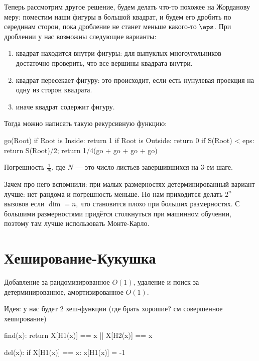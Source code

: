 Теперь рассмотрим другое решение, будем делать что-то похожее на Жорданову меру:
поместим наши фигуры в большой квадрат, и будем его дробить по серединам сторон,
пока дробление не станет меньше какого-то $\eps$. При дроблении у нас возможны следующие варианты:

\begin{enumerate}
    \item квадрат находится внутри фигуры: для выпуклых многоугольников
        достаточно проверить, что все вершины квадрата внутри.
    \item квадрат пересекает фигуру: это происходит, если есть нунулевая проекция
        на одну из сторон квадрата.
    \item иначе квадрат содержит фигуру.
\end{enumerate}

Тогда можно написать такую рекурсивную функцию:

\begin{cppcode}
    go(Root)
    if Root is Inside:
        return 1
    if Root is Outside:
        return 0
    if S(Root) < eps:
        return S(Root)/2;
    return 1/4(go + go + go + go)
\end{cppcode}

Погрешность $\frac{1}{N}$, где $N$ --- это число листьев завершившихся на 3-ем шаге.

Зачем про него вспомнили: при малых размерностях детерминированный вариант лучше: нет рандома
и погрешность меньше. Но нам приходится делать $2^n$ вызовов если $\dim = n$, что становится
плохо при больших размерностях. С большими размерностями придётся столкнуться при машинном
обучении, поэтому там лучше использовать Монте-Карло.

\section{Хеширование-Кукушка}

Добавление за рандомизированное $O(1)$, удаление и поиск за детерминированное, амортизированное $O(1)$.

Идея: у нас будет 2 хеш-функции (где брать хорошие? см совершенное хеширование)

\begin{cppcode}
    find(x):
        return X[H1(x)] == x || X[H2(x)] == x
\end{cppcode}

\begin{cppcode}
    del(x):
        if X[H1(x)] == x:
            x[H1(x)] = -1
\end{cppcode}

